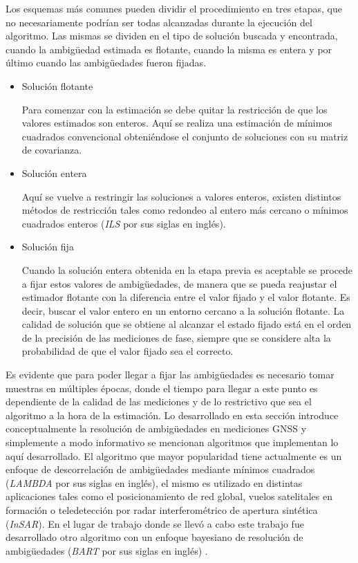 \documentclass[a4paper,12pt,oneside,onecolumn,final,openright]{book}%
\begin{document}
	Los esquemas más comunes pueden dividir el procedimiento en tres etapas, que no necesariamente podrían ser todas alcanzadas durante la ejecución del algoritmo. Las mismas se dividen en el tipo de solución buscada y encontrada, cuando la ambigüedad estimada es flotante, cuando la misma es entera y por último cuando las ambigüedades fueron fijadas.
\begin{itemize}
	\item Solución flotante
	
	Para comenzar con la estimación se debe quitar la restricción de que los valores estimados son enteros. Aquí se realiza una estimación de mínimos cuadrados convencional obteniéndose el conjunto de soluciones con su matriz de covarianza.
	\item Solución entera
	
	Aquí se vuelve a restringir las soluciones a valores enteros, existen distintos métodos de restricción tales como redondeo al entero más cercano o mínimos cuadrados enteros (\textit{ILS} por sus siglas en inglés).
	\item Solución fija
	
	Cuando la solución entera obtenida en la etapa previa es aceptable se procede a fijar estos valores de ambigüedades, de manera que se pueda reajustar el estimador flotante con la diferencia entre el valor fijado y el valor flotante. Es decir, buscar el valor entero en un entorno cercano a la solución flotante. La calidad de solución que se obtiene al alcanzar el estado fijado está en el orden de la precisión de las mediciones de fase, siempre que se considere alta la probabilidad de que el valor fijado sea el correcto.
\end{itemize}
	
	Es evidente que para poder llegar a fijar las ambigüedades es necesario tomar muestras en múltiples épocas, donde el tiempo para llegar a este punto es dependiente de la calidad de las mediciones y de lo restrictivo que sea el algoritmo a la hora de la estimación. Lo desarrollado en esta sección introduce conceptualmente la resolución de ambigüedades en mediciones GNSS y simplemente a modo informativo se mencionan algoritmos que implementan lo aquí desarrollado. El algoritmo que mayor popularidad tiene actualmente es un enfoque de descorrelación de ambigüedades mediante mínimos cuadrados (\textit{LAMBDA} por sus siglas en inglés), el mismo es utilizado en distintas aplicaciones tales como el posicionamiento de red global, vuelos satelitales en formación o teledetección por radar interferométrico de apertura sintética (\textit{InSAR}). En el lugar de trabajo donde se llevó a cabo este trabajo fue desarrollado otro algoritmo con un enfoque  bayesiano de resolución de ambigüedades (\textit{BART} por sus siglas en inglés) \cite{bart}.
\end{document}
